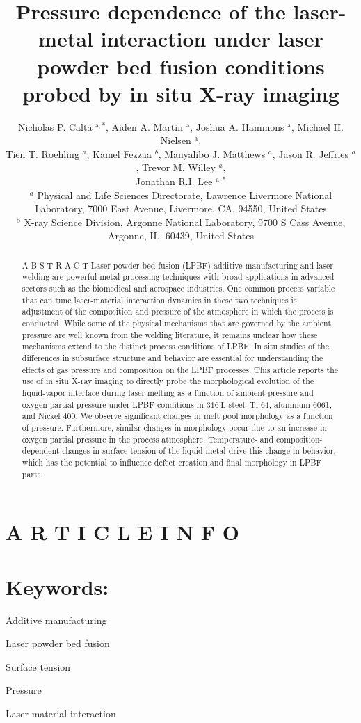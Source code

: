 \documentclass[10pt]{article}
\title{Pressure dependence of the laser-metal interaction under laser powder bed fusion conditions probed by in situ X-ray imaging }
\author{Nicholas P. Calta ${ }^{\mathrm{a}, *}$, Aiden A. Martin ${ }^{\mathrm{a}}$, Joshua A. Hammons ${ }^{\mathrm{a}}$, Michael H. Nielsen ${ }^{\mathrm{a}}$,\\
Tien T. Roehling ${ }^{a}$, Kamel Fezzaa ${ }^{b}$, Manyalibo J. Matthews ${ }^{a}$, Jason R. Jeffries ${ }^{a}$, Trevor M. Willey ${ }^{a}$,\\
Jonathan R.I. Lee ${ }^{\mathrm{a}, *}$\\
${ }^{a}$ Physical and Life Sciences Directorate, Lawrence Livermore National Laboratory, 7000 East Avenue, Livermore, CA, 94550, United States\\
${ }^{\mathrm{b}}$ X-ray Science Division, Argonne National Laboratory, 9700 S Cass Avenue, Argonne, IL, 60439, United States}
\date{}
\begin{document}
\maketitle


\section*{A R T I C L E I N F O}
\section*{Keywords:}
Additive manufacturing

Laser powder bed fusion

Surface tension

Pressure

Laser material interaction

\begin{abstract}
A B S T R A C T Laser powder bed fusion (LPBF) additive manufacturing and laser welding are powerful metal processing techniques with broad applications in advanced sectors such as the biomedical and aerospace industries. One common process variable that can tune laser-material interaction dynamics in these two techniques is adjustment of the composition and pressure of the atmosphere in which the process is conducted. While some of the physical mechanisms that are governed by the ambient pressure are well known from the welding literature, it remains unclear how these mechanisms extend to the distinct process conditions of LPBF. In situ studies of the differences in subsurface structure and behavior are essential for understanding the effects of gas pressure and composition on the LPBF processes. This article reports the use of in situ X-ray imaging to directly probe the morphological evolution of the liquid-vapor interface during laser melting as a function of ambient pressure and oxygen partial pressure under LPBF conditions in $316 \mathrm{~L}$ steel, Ti-64, aluminum 6061, and Nickel 400. We observe significant changes in melt pool morphology as a function of pressure. Furthermore, similar changes in morphology occur due to an increase in oxygen partial pressure in the process atmosphere. Temperature- and composition-dependent changes in surface tension of the liquid metal drive this change in behavior, which has the potential to influence defect creation and final morphology in LPBF parts.
\end{abstract}
\end{document}
